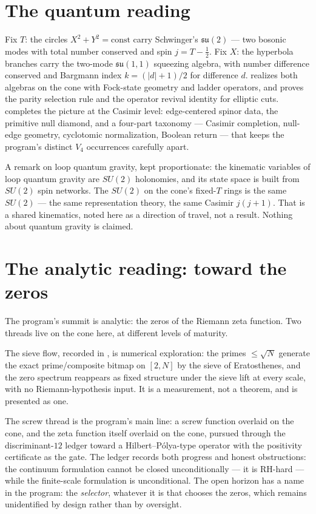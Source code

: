 \documentclass[11pt]{amsart}
\theoremstyle{remark}
\begin{document}
\section{The quantum reading}

Fix $T$: the circles $X^2+Y^2=\mathrm{const}$ carry Schwinger's
$\mathfrak{su}(2)$ --- two bosonic modes with total number conserved
and spin $j=T-\tfrac12$.  Fix $X$: the hyperbola branches carry the
two-mode $\mathfrak{su}(1,1)$ squeezing algebra, with number difference
conserved and Bargmann index $k=(|d|+1)/2$ for difference $d$.
\cite{Ebert2026Quantum} realizes both algebras on the cone with
Fock-state geometry and ladder operators, and proves the parity
selection rule and the operator revival identity for elliptic cuts.
\cite{Ebert2026NullDiamond} completes the picture at the Casimir
level: edge-centered spinor data, the primitive null diamond, and a
four-part taxonomy --- Casimir completion, null-edge geometry,
cyclotomic normalization, Boolean return --- that keeps the program's
distinct $V_4$ occurrences carefully apart.

A remark on loop quantum gravity, kept proportionate: the kinematic
variables of loop quantum gravity are $SU(2)$ holonomies, and its state
space is built from $SU(2)$ spin networks.  The $SU(2)$ on the cone's
fixed-$T$ rings is the same $SU(2)$ --- the same representation
theory, the same Casimir $j(j+1)$.  That is a shared kinematics, noted
here as a direction of travel, not a result.  Nothing about quantum
gravity is claimed.

\section{The analytic reading: toward the zeros}

The program's summit is analytic: the zeros of the Riemann zeta
function.  Two threads live on the cone here, at different levels of
maturity.

The sieve flow, recorded in \cite{Ebert2026Sieve}, is numerical
exploration: the primes $\le\sqrt N$ generate the exact
prime/composite bitmap on $[2,N]$ by the sieve of Eratosthenes, and
the zero spectrum reappears as fixed structure under the sieve lift at
every scale, with no Riemann-hypothesis input.  It is a measurement,
not a theorem, and is presented as one.

The screw thread is the program's main line: a screw function
overlaid on the cone, and the zeta function itself overlaid on the
cone, pursued through the discriminant-$12$ ledger toward a
Hilbert--P\'olya-type operator with the positivity certificate as the
gate.  The ledger records both progress and honest obstructions: the
continuum formulation cannot be closed unconditionally --- it is
RH-hard --- while the finite-scale formulation is unconditional.  The
open horizon has a name in the program: the \emph{selector},
whatever it is that chooses the zeros, which remains unidentified by
design rather than by oversight.
\end{document}
